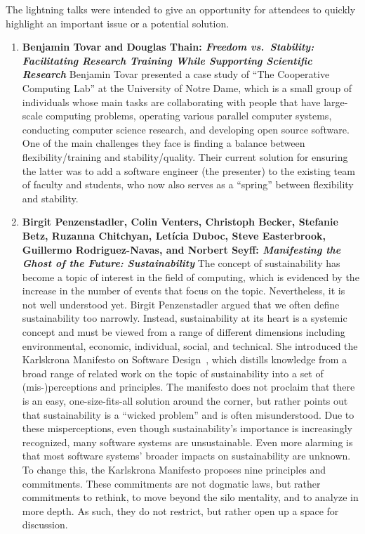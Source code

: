 \documentclass[11pt, oneside]{amsart}
\begin{document}
The lightning talks were intended to give an opportunity for attendees to
quickly highlight an important issue or a potential solution.
%
\begin{enumerate}
\item \textbf{Benjamin Tovar and Douglas Thain: \textit{Freedom vs.\ Stability:
Facilitating Research Training While Supporting Scientific Research}} Benjamin
Tovar presented a case study of ``The Cooperative Computing Lab'' at the
University of Notre Dame, which is a small group of individuals whose main tasks
are collaborating with people that have large-scale computing problems,
operating various parallel computer systems, conducting computer science
research, and developing open source software. One of the main challenges they
face is finding a balance between flexibility/training and stability/quality.
Their current solution for ensuring the latter was to add a software engineer
(the presenter) to the existing team of faculty and students, who now also
serves as a ``spring'' between flexibility and stability.

\item \textbf{Birgit Penzenstadler, Colin Venters, Christoph Becker, Stefanie
Betz, Ruzanna Chitchyan, Let\'{i}cia Duboc, Steve Easterbrook, Guillermo
Rodriguez-Navas, and Norbert Seyff: \textit{Manifesting the Ghost of the Future:
Sustainability}} The concept of sustainability has become a topic of interest in
the field of computing, which is evidenced by the increase in the number of
events that focus on the topic. Nevertheless, it is not well understood yet.
Birgit Penzenstadler argued that we often define sustainability too narrowly.
Instead, sustainability at its heart is a systemic concept and must be viewed
from a range of different dimensions including environmental, economic,
individual, social, and technical. She introduced the Karlskrona Manifesto on
Software Design~\cite{Becker:2014}, which distills knowledge from a broad range
of related work on the topic of sustainability into a set of (mis-)perceptions
and principles. The manifesto does not proclaim that there is an easy,
one-size-fits-all solution around the corner, but rather points out that
sustainability is a ``wicked problem'' and is often misunderstood. Due to these
misperceptions, even though sustainability's importance is increasingly
recognized, many software systems are unsustainable. Even more alarming is that
most software systems' broader impacts on sustainability are unknown. To change
this, the Karlskrona Manifesto proposes nine principles and commitments. These
commitments are not dogmatic laws, but rather commitments to rethink, to move
beyond the silo mentality, and to analyze in more depth. As such, they do not
restrict, but rather open up a space for discussion.


\end{enumerate}
\end{document}
